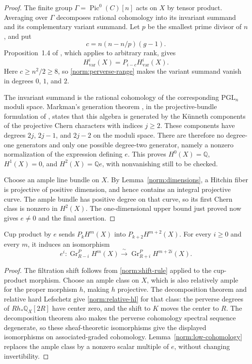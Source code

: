 \begin{proof}
The finite group $\Gamma=\operatorname{Pic}^0(C)[n]$ acts on $X$ by
tensor product.  Averaging over $\Gamma$ decomposes rational cohomology
into its invariant summand and its complementary variant summand.
Let $p$ be the smallest prime divisor of $n$, and put
\[
 c=n(n-n/p)(g-1).
\]
Proposition~1.4 of \cite{dCMS2022}, which applies to arbitrary rank,
gives
\[
 H^i_{\mathrm{var}}(X)=P_{i-c}H^i_{\mathrm{var}}(X).
\]
Here $c\ge n^2/2\ge8$, so \eqref{norm:perverse-range} makes the
variant summand vanish in degrees $0$, $1$, and $2$.

The invariant summand is the rational cohomology of the corresponding
$\mathrm{PGL}_n$ moduli space.  Markman's generation theorem \cite[Theorem~7]{Markman2002}, in the
projective-bundle formulation of \cite[Theorem~2.1(i)]{MS2024}, states
that this algebra is generated by the K\"unneth components of the
projective Chern characters with indices $j\ge2$.  These components
have degrees $2j$, $2j-1$, and $2j-2$ on the moduli space.  There are
therefore no degree-one generators and only one possible degree-two
generator, namely a nonzero normalization of the expression defining
$e$.  This proves $H^0(X)=\mathbb Q$, $H^1(X)=0$, and
$H^2(X)=\mathbb Q e$, with nonvanishing still to be checked.

Choose an ample line bundle on $X$.  By Lemma~\ref{norm:dimensions},
a Hitchin fiber is projective of positive dimension, and hence contains
an integral projective curve.  The ample bundle has positive degree on
that curve, so its first Chern class is nonzero in $H^2(X)$.  The
one-dimensional upper bound just proved now gives $e\ne0$ and the
final assertion.
\end{proof}

\begin{proposition}\label{norm:relative-lefschetz}
Cup product by $e$ sends $P_kH^m(X)$ into $P_{k+2}H^{m+2}(X)$.
For every $i\ge0$ and every $m$, it induces an isomorphism
\begin{equation}\label{norm:relative-hl}
 e^i:\operatorname{Gr}^P_{R-i}H^m(X)
 \xrightarrow{\ \sim\ }
 \operatorname{Gr}^P_{R+i}H^{m+2i}(X).
\end{equation}
\end{proposition}

\begin{proof}
The filtration shift follows from \eqref{norm:shift-rule} applied to
the cup-product morphism.  Choose an ample class on $X$, which is
also relatively ample for the proper morphism $h$, making $h$
projective.  The decomposition theorem and relative hard Lefschetz
\cite[Theorems~6.2.5 and~6.2.10]{BBD1982} give \eqref{norm:relative-hl} for that
class: the perverse degrees of $Rh_*\mathbb Q_X[2R]$ have center zero,
and the shift to $K$ moves the center to $R$.  The decomposition theorem
also makes the perverse cohomology spectral sequence degenerate, so
these sheaf-theoretic isomorphisms give the displayed isomorphisms on
associated-graded cohomology.  Lemma~\ref{norm:low-cohomology} replaces
the ample class by a nonzero scalar multiple of $e$, without changing
invertibility.
\end{proof}

